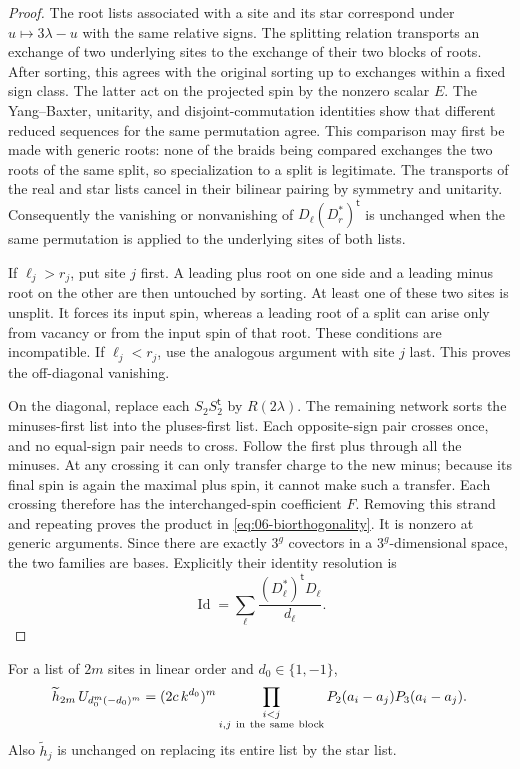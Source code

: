 \begin{proof}
The root lists associated with a site and its star correspond under
\(u\mapsto3\lambda-u\) with the same relative signs.  The splitting
relation transports an exchange of two underlying sites to the
exchange of their two blocks of roots.  After sorting, this agrees
with the original sorting up to exchanges within a fixed sign class.
The latter act on the projected spin by the nonzero scalar \(E\).
The Yang--Baxter, unitarity, and disjoint-commutation identities show
that different reduced sequences for the same permutation agree.
This comparison may first be made with generic roots: none of the
braids being compared exchanges the two roots of the same split,
so specialization to a split is legitimate.
The transports of the real and star lists cancel in their bilinear
pairing by symmetry and unitarity.  Consequently the vanishing or
nonvanishing of \(D_\ell(D_r^*)^{\mathsf t}\) is unchanged when the same
permutation is applied to the underlying sites of both lists.

If \(\ell_j>r_j\), put site \(j\) first.  A leading plus root on one
side and a leading minus root on the other are then untouched by
sorting.  At least one of these two sites is unsplit.  It forces its
input spin, whereas a leading root of a split can arise only from
vacancy or from the input spin of that root.  These conditions are
incompatible.  If \(\ell_j<r_j\), use the analogous argument with
site \(j\) last.  This proves the off-diagonal vanishing.

On the diagonal, replace each \(S_2S_2^{\mathsf t}\) by
\(R(2\lambda)\).  The remaining network sorts the minuses-first list
into the pluses-first list.  Each opposite-sign pair crosses once,
and no equal-sign pair needs to cross.  Follow the first plus through
all the minuses.  At any crossing it can only transfer charge to the
new minus; because its final spin is again the maximal plus spin,
it cannot make such a transfer.  Each crossing therefore has the
interchanged-spin coefficient \(F\).  Removing this strand and
repeating proves the product in \eqref{eq:06-biorthogonality}.
It is nonzero at generic arguments.  Since there are exactly \(3^g\)
covectors in a \(3^g\)-dimensional space, the two families are bases.
Explicitly their identity resolution is
\[
 \operatorname{Id}
 =\sum_{\ell}\frac{(D_\ell^*)^{\mathsf t}D_\ell}{d_\ell}.
\]
\end{proof}

\begin{lemma}
\label{lem:06-two-blocks}
For a list of \(2m\) sites in linear order and \(d_0\in\{1,-1\}\),
\begin{equation}
 \widetilde h_{2m}\,U_{d_0^m(-d_0)^m}
 =(2c\,k^{d_0})^m
 \prod_{\substack{i<j\\i,j\ {\rm in\ the\ same\ block}}}
 P_2(a_i-a_j)P_3(a_i-a_j).
 \label{eq:06-two-blocks}
\end{equation}
Also \(\widetilde h_j\) is unchanged on replacing its entire list by
the star list.
\end{lemma}

